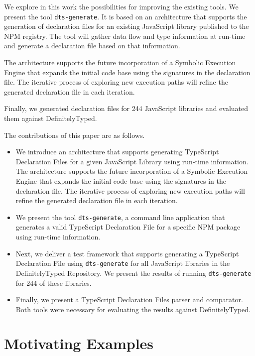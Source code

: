\documentclass[a4paper,english,cleveref, autoref]{lipics-v2019}
\begin{document}
We explore in this work the possibilities for improving the existing tools. We present the tool \lstinline[language={}]{dts-generate}. It is based on an architecture that supports the generation of declaration files for an existing JavaScript library published to the NPM registry. The tool will gather data flow and type information at run-time and generate a declaration file based on that information.

The architecture supports the future incorporation of a Symbolic Execution Engine that expands the initial code base using the signatures in the declaration file. The iterative process of exploring new execution paths will refine the generated declaration file in each iteration.

Finally, we generated declaration files for 244 JavaScript libraries and evaluated them against DefinitelyTyped.

The contributions of this paper are as follows.
\begin{itemize}
    \item We introduce an architecture that supports generating TypeScript Declaration Files for a given JavaScript Library using run-time information. The architecture supports the future incorporation of a Symbolic Execution Engine that expands the initial code base using the signatures in the declaration file. The iterative process of exploring new execution paths will refine the generated declaration file in each iteration.

    \item We present the tool \lstinline{dts-generate}, a command line application that generates a valid TypeScript Declaration File for a specific NPM package using run-time information.

    \item Next, we deliver a test framework that supports generating a TypeScript Declaration File using \lstinline{dts-generate} for all JavaScript libraries in the DefinitelyTyped Repository. We present the results of running \lstinline{dts-generate} for 244 of these libraries.

    \item Finally, we present a TypeScript Declaration Files parser and comparator. Both tools were necessary for evaluating the results against DefinitelyTyped.
\end{itemize}

\section{Motivating Examples}
\end{document}

